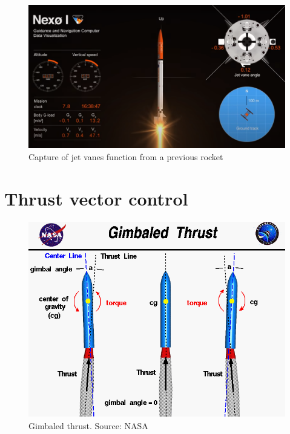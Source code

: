 \begin{figure}[H]
  \centering
  \includegraphics[scale=0.45]{graphics/Jetvanes.png}
  \caption{Capture of jet vanes function from a previous rocket}
  \label{jetvanes}
\end{figure}

\section{Thrust vector control}

\begin{figure}[H]
  \centering
  \includegraphics[scale=0.8]{graphics/gimbaled.png}
  \caption{Gimbaled thrust.  Source: NASA}
  \label{gimbaledthrust}
\end{figure}


